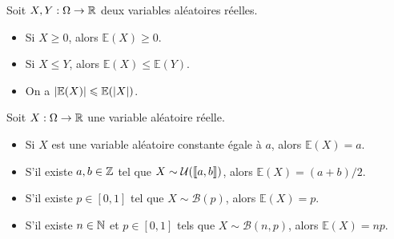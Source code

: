 \documentclass{magnolia}
\begin{document}
\begin{proposition}
Soit $X,Y:\Omega\to\mathbb{R}$ deux variables aléatoires réelles.
\begin{itemize}
\item Si $X\geq 0$, alors $\mathbb{E}(X)\geq 0$.
\item Si $X\leq Y$, alors $\mathbb{E}(X)\leq\mathbb{E}(Y)$.
\item On a $\left|\mathbb{E}(X)\right|\leqslant \mathbb{E}(\left|X\right|)$.
\end{itemize}
\end{proposition}

\begin{proposition}
Soit $X:\Omega\to\mathbb{R}$ une variable aléatoire réelle.
\begin{itemize}
\item Si $X$ est une variable aléatoire constante égale à $a$, alors $\mathbb{E}(X)=a$.
\item S'il existe $a,b\in\mathbb{Z}$ tel que $X\sim\mathcal{U}(\left\llbracket a,b\right\rrbracket)$, alors
  $\mathbb{E}(X)=(a+b)/2$.
\item S'il existe $p\in[0,1]$ tel que $X\sim\mathcal{B}(p)$, alors $\mathbb{E}(X)=p$.
\item S'il existe $n\in\mathbb{N}$ et $p\in[0,1]$ tels que $X\sim\mathcal{B}(n, p)$, alors
  $\mathbb{E}(X)=np$. 
\end{itemize}
\end{proposition}

\end{document}
